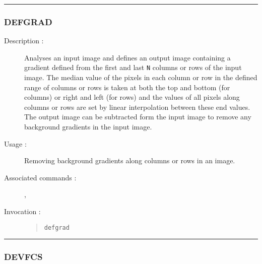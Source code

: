 \hrule 
\subsubsection*{\label{DEFGRAD}DEFGRAD}

\begin{description}

\item[Description :] Analyses an input image and defines an output
image containing a gradient defined from the first and last {\tt N}
columns or rows of the input image.  The median value of the pixels in
each column or row in the defined range of columns or rows is taken at
both the top and bottom (for columns) or right and left (for rows) and
the values of all pixels along columns or rows are set by linear
interpolation between these end values. The output image can be
subtracted form the input image to remove any background gradients in
the input image.

\item[Usage :] Removing background gradients along columns or rows in an image.

\item[Associated commands :] {\tt {}}, 
{\tt {}}

\item[Invocation :]

\begin{quote}{\tt  defgrad }\end{quote}

\end{description}

\hrule 
\subsubsection*{\label{DEVFCS}DEVFCS}

